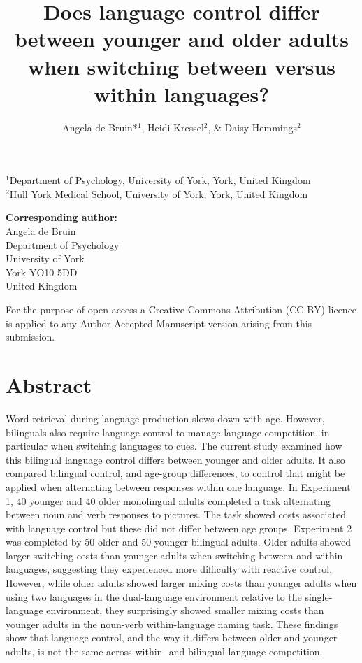 \documentclass[
]{article}
\title{Does language control differ between younger and older adults when switching between versus within languages?}
\author{Angela de Bruin*\(^1\), Heidi Kressel\(^2\), \& Daisy Hemmings\(^2\)}
\date{}
\begin{document}
\maketitle

\(^1\)Department of Psychology, University of York, York, United Kingdom\\
\(^2\)Hull York Medical School, University of York, York, United Kingdom

\textbf{Corresponding author:}\\
Angela de Bruin\\
Department of Psychology\\
University of York\\
York YO10 5DD\\
United Kingdom

For the purpose of open access a Creative Commons Attribution (CC BY) licence is applied to any Author Accepted Manuscript version arising from this submission.

\newpage

\hypertarget{abstract}{%
\section*{Abstract}\label{abstract}}

Word retrieval during language production slows down with age. However, bilinguals also require language control to manage language competition, in particular when switching languages to cues. The current study examined how this bilingual language control differs between younger and older adults. It also compared bilingual control, and age-group differences, to control that might be applied when alternating between responses within one language. In Experiment 1, 40 younger and 40 older monolingual adults completed a task alternating between noun and verb responses to pictures. The task showed costs associated with language control but these did not differ between age groups. Experiment 2 was completed by 50 older and 50 younger bilingual adults. Older adults showed larger switching costs than younger adults when switching between and within languages, suggesting they experienced more difficulty with reactive control. However, while older adults showed larger mixing costs than younger adults when using two languages in the dual-language environment relative to the single-language environment, they surprisingly showed smaller mixing costs than younger adults in the noun-verb within-language naming task. These findings show that language control, and the way it differs between older and younger adults, is not the same across within- and bilingual-language competition.
\end{document}
